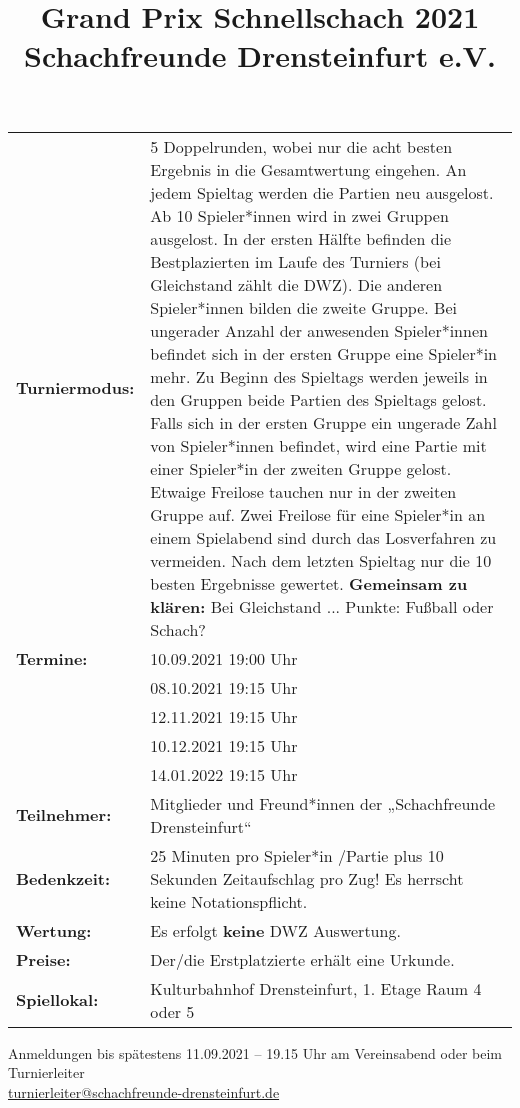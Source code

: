 \documentclass[a4paper,parskip=full-,DIV18]{scrartcl}
\title{Grand Prix Schnellschach 2021 \\Schachfreunde Drensteinfurt e.V.}
\date{}
\begin{document}
\maketitle


\bigskip

\begin{tabular}{p{3 cm} p{13.5 cm}}
	\textbf{Turniermodus:} & 5 Doppelrunden, wobei nur die acht besten Ergebnis in die Gesamtwertung eingehen. An jedem Spieltag werden die Partien neu ausgelost. Ab 10 Spieler*innen wird in zwei Gruppen ausgelost. In der ersten Hälfte befinden die Bestplazierten im Laufe des Turniers (bei Gleichstand zählt die DWZ). Die anderen Spieler*innen bilden die zweite Gruppe. Bei ungerader Anzahl der anwesenden Spieler*innen befindet sich in der ersten Gruppe eine Spieler*in mehr. Zu Beginn des Spieltags werden jeweils in den Gruppen beide Partien des Spieltags gelost. Falls sich in der ersten Gruppe ein ungerade Zahl von Spieler*innen befindet, wird eine Partie mit einer Spieler*in der zweiten Gruppe gelost. Etwaige Freilose tauchen nur in der zweiten Gruppe auf. Zwei Freilose für eine Spieler*in an einem Spielabend sind durch das Losverfahren zu vermeiden. Nach dem letzten Spieltag nur die 10 besten Ergebnisse gewertet. \textbf{Gemeinsam zu klären:} Bei Gleichstand ...  Punkte: Fußball oder Schach?     \\
	\textbf{Termine:}      & 10.09.2021 19:00 Uhr \\
	                       & 08.10.2021 19:15 Uhr \\
	                       & 12.11.2021 19:15 Uhr \\
	                       & 10.12.2021 19:15 Uhr \\
	                       & 14.01.2022 19:15 Uhr \\
	\textbf{Teilnehmer:}   & Mitglieder und Freund*innen der „Schachfreunde Drensteinfurt“  \\
	\textbf{Bedenkzeit:}   & 25 Minuten pro Spieler*in /Partie plus 10 Sekunden Zeitaufschlag pro Zug! Es herrscht keine Notationspflicht. \\
	\textbf{Wertung:}      & Es erfolgt \textbf{keine} DWZ Auswertung.                                                  \\
	\textbf{Preise:}       & Der/die Erstplatzierte erhält eine Urkunde. \\
	\textbf{Spiellokal:}   & Kulturbahnhof Drensteinfurt, 1. Etage Raum 4 oder 5
\end{tabular}


\bigskip

Anmeldungen bis spätestens 11.09.2021 – 19.15 Uhr am Vereinsabend oder beim Turnierleiter \\ \href{mailto:turnierleiter@schachfreunde-drensteinfurt.de}{turnierleiter@schachfreunde-drensteinfurt.de}
\end{document}
